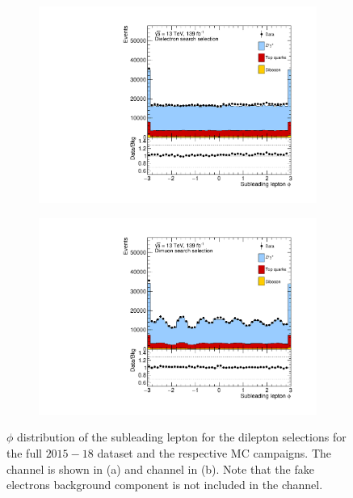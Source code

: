 \begin{figure}[]
    \centering
    \begin{subfigure}[b]{0.49\textwidth}
        \centering
        \includegraphics[width=\textwidth]{figures/analysis/datamc/dataMCcompare/ee_phi2.pdf}
        \caption{}
        \label{fig:datamc:eephi2}
    \end{subfigure}
    \begin{subfigure}[b]{0.49\textwidth}
        \centering
        \includegraphics[width=\textwidth]{figures/analysis/datamc/dataMCcompare/uu_phi2.pdf}
        \caption{}
        \label{fig:datamc:uuphi2}
    \end{subfigure}
    \caption[$\phi$ distribution of the subleading lepton for the dilepton selections for the full $2015-18$ dataset and the respective MC campaigns.]{$\phi$ distribution of the subleading lepton for the dilepton selections for the full $2015-18$ dataset and the respective MC campaigns. The \ee channel is shown in (a) and \mumu channel in (b). Note that the fake electrons background component is not included in the \ee channel.}
    \label{fig:datamc:phi2}
\end{figure}

\clearpage